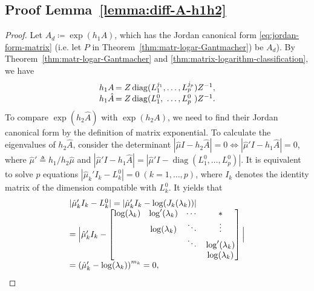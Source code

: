 \documentclass[letterpaper,10pt,journal,final]{IEEEtran}
\theoremstyle{definition}
\theoremstyle{remark}
\newcommand{\diag}{\operatorname{diag}}
\begin{document}
\subsection{Proof Lemma~\ref{lemma:diff-A-h1h2}}
\label{appdix:subsec:proof-lemma-A-h1h2}

\begin{proof}
  Let $A_d \coloneqq \exp(h_1 A)$, which has the Jordan canonical form
  \eqref{eq:jordan-form-matrix} (i.e. let $P$ in
  Theorem~\ref{thm:matr-logar-Gantmacher}) be $A_d$). By
  Theorem~\ref{thm:matr-logar-Gantmacher} and
  \ref{thm:matrix-logarithm-classification}, we have
  \begin{displaymath}
    \begin{array}{l@{\,}l@{\,}l@{}l}
      h_1A &= Z \diag(L_1^{j_1}, &\dots, L_p^{j_p}&) Z^{-1}, \\
      h_1\hat{A} &= Z \diag(L_1^{0}, &\dots, L_p^{0}&) Z^{-1}.
    \end{array}
  \end{displaymath}
  To compare $\exp(h_2 \hat{A})$ with $\exp(h_2 A)$, we need to find
  their Jordan canonical form by the definition of matrix exponential. To calculate the
  eigenvalues of $h_2\hat{A}$, consider the determinant
  $|\hat{\mu} I - h_2 \hat{A} | = 0 \Leftrightarrow |\hat{\mu}' I - h_1
  \hat{A} | = 0$, where $\hat{\mu}' \triangleq h_1/h_2 \hat{\mu}$ and
  $|\hat{\mu}' I - h_1 \hat{A} | = |\hat{\mu}' I - \diag(L_1^0, \dots,
  L_p^0)|$. It is equivalent to solve $p$ equations
  $|\hat{\mu}_k' I_k - L_k^0| = 0\; (k = 1,\dots,p)$, where $I_k$ denotes the
  identity matrix of the dimension compatible with $L_k^0$. It yields that
  \begin{displaymath}
    \begin{array}{l@{}l}
      &|\hat{\mu}_k' I_k - L_k^0| = |\hat{\mu}_k' I_k - \log(J_k(\lambda_k))| \\
      &= \Big| \hat{\mu}_k' I_k -
        \begin{bmatrix}
          \log(\lambda_k) & \log'(\lambda_k) & \cdots & * \\
          & \log(\lambda_k) & \ddots & \vdots \\
          & & \ddots & \log'(\lambda_k)\\
          & & & \log(\lambda_k)
        \end{bmatrix}
                \Big| \\
      &= \left( \hat{\mu}_k' - \log(\lambda_k) \right)^{m_k} = 0,
    \end{array}
  \end{displaymath}

\end{proof}
\end{document}
